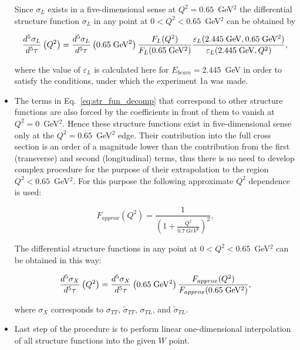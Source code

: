 \begin{itemize}
Since $\sigma_{L}$ exists in a five-dimensional sense at $Q^2 = 0.65$~GeV$^2$ the differential structure function $\sigma_{L}$ in any point at $0 < Q^2<0.65$~GeV$^2$ can be obtained by

\begin{equation}
\frac{d^5\sigma_{L}}{d^5\tau}\left ( Q^2 \right ) = \frac{d^5\sigma_{L}}{d^5\tau}\left ( 0.65\;{\rm GeV^2} \right )\frac{F_{L}(Q^2)}{F_{L}(0.65\;{\rm GeV^2})}\frac{\varepsilon_{L}(2.445\;{\rm GeV},0.65\;{\rm GeV^2})}{\varepsilon_{L}(2.445\;{\rm GeV},Q^2)},
\label{eq:q2_dep_fit_sig_l}
\end{equation}

where the value of $\varepsilon_{L}$ is calculated here for $E_{beam} = 2.445$~GeV in order to satisfy the conditions, under which the experiment 1a was made.



\item The terms in Eq.~\eqref{eq:str_fun_decomp} that correspond to other structure functions are also forced by the coefficients in front of them to vanish at $Q^2 = 0$~GeV$^2$. Hence these structure functions exist in five-dimensional sense only at the $Q^2 = 0.65$~GeV$^2$ edge. Their contribution into the full cross section is an order of a magnitude lower than the contribution from the first (transverse) and second (longitudinal) terms, thus there is no need to develop complex procedure for the purpose of their extrapolation to the region $Q^2 < 0.65$~GeV$^2$. For this purpose the following approximate $Q^2$ dependence is used:

 \begin{equation}
F_{approx}(Q^2) = \frac{1}{\left (1+\frac{Q^2}{0.7~GeV^2}\right )^{2}},
\label{eq:q2_dep}
\end{equation}

The differential structure functions in any point at $0 < Q^2<0.65$~GeV$^2$ can be obtained in this way:

 \begin{equation}
\frac{d^5\sigma_{X}}{d^5\tau}\left ( Q^2 \right ) = \frac{d^5\sigma_{X}}{d^5\tau}\left ( 0.65\;{\rm GeV^2} \right )\frac{F_{approx}(Q^2)}{F_{approx}(0.65\;{\rm GeV^2})},
\label{eq:sig_x_acale}
\end{equation}

where $\sigma_X$ corresponds to $\sigma_{TT}$, $\widetilde{\sigma}_{TT}$, $\sigma_{TL}$, and $\widetilde{\sigma}_{TL}$.

\item Last step of the procedure is to perform linear one-dimensional interpolation of all structure functions into the given $W$ point.

\end{itemize}



